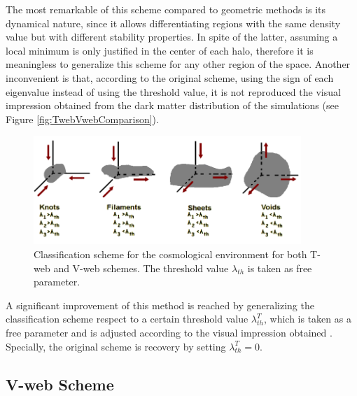 The most remarkable of this scheme compared to geometric methods is
its dynamical nature, since it allows differentiating regions with the 
same density value but with different stability properties. In spite of
the latter, assuming a local minimum is only justified in the center of
each halo, therefore it is meaningless to generalize this scheme for any
other region of the space. Another inconvenient is that, according to the
original scheme, using the sign of each eigenvalue instead of using the
threshold value, it is not reproduced the visual impression obtained 
from the dark matter distribution of the simulations (see Figure
\ref{fig:TwebVwebComparison}).


\begin{figure}[htbp]
	\centering
	\includegraphics[width=0.9\textwidth]
	{./figures/2_theoretical_framework/EnvironmentClassification.png}

	\caption{\small{Classification scheme for the cosmological environment for
	both T-web and V-web schemes. The threshold value $\lambda_{th}$ is taken as
	free parameter.}}
	
	\label{fig:ClassificationSchemeTweb}
\end{figure}



A significant improvement of this method is reached by generalizing the
classification scheme respect to a certain threshold value $\lambda_{th}^T$,
which is taken as a free parameter and is adjusted according to the visual 
impression obtained \cite{forero2008}. Specially, the original scheme is 
recovery by setting $\lambda_{th}^T=0$.



	\subsection{V-web Scheme}
	\label{subsec:TheV-webMethod}


